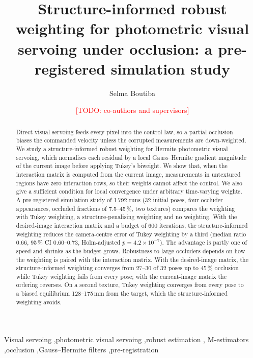 \documentclass[preprint,12pt]{elsarticle}
\theoremstyle{remark}
\newcommand{\todo}[1]{\textcolor{red}{[TODO: #1]}}
\begin{document}
\begin{frontmatter}

\title{Structure-informed robust weighting for photometric visual servoing
under occlusion: a pre-registered simulation study}

\author[inst1]{Selma Boutiba}
\author[inst1]{\todo{co-authors and supervisors}}
\affiliation[inst1]{organization={\todo{laboratory, university}},
            city={\todo{city}},
            country={\todo{country}}}

\begin{abstract}
Direct visual servoing feeds every pixel into the control law, so a partial
occlusion biases the commanded velocity unless the corrupted measurements are
down-weighted. We study a structure-informed robust weighting for Hermite
photometric visual servoing, which normalises each residual by a local
Gauss--Hermite gradient magnitude of the current image before applying Tukey's
biweight. We show that, when the interaction matrix is computed from the
current image, measurements in untextured regions have zero interaction rows,
so their weights cannot affect the control. We also give a sufficient
condition for local convergence under arbitrary time-varying weights. A
pre-registered simulation study of 1\,792 runs (32 initial poses, four occluder
appearances, occluded fractions of 7.5--45\,\%, two textures) compares the
weighting with Tukey weighting, a structure-penalising weighting and no
weighting. With the desired-image interaction matrix and a budget of 600
iterations, the structure-informed weighting reduces the camera-centre error of
Tukey weighting by a third (median ratio 0.66, 95\,\% CI 0.60--0.73,
Holm-adjusted $p=4.2\times10^{-7}$). The advantage is partly one of speed and
shrinks as the budget grows. Robustness to large occluders depends on how the
weighting is paired with the interaction matrix. With the desired-image matrix,
the structure-informed weighting converges from 27--30 of 32 poses up to
45\,\% occlusion while Tukey weighting fails from every pose; with the
current-image matrix the ordering reverses. On a second texture, Tukey
weighting converges from every pose to a biased equilibrium 128--175\,mm from
the target, which the structure-informed weighting avoids.
\end{abstract}

\begin{keyword}
Visual servoing \sep photometric visual servoing \sep robust estimation \sep
M-estimators \sep occlusion \sep Gauss--Hermite filters \sep pre-registration
\end{keyword}

\end{frontmatter}
\end{document}
